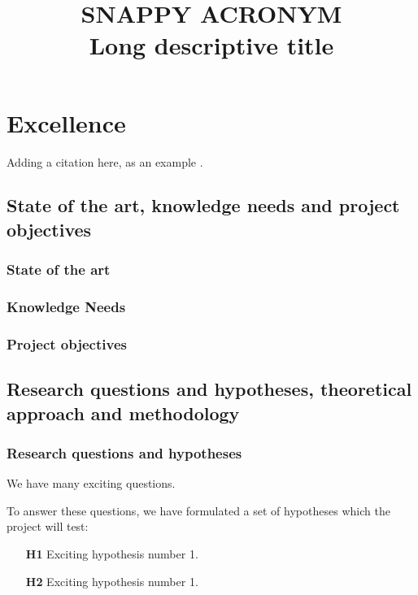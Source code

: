 \documentclass[a4paper,11pt,english]{article}
\title{ \vspace{-1.5cm}SNAPPY ACRONYM\\ Long descriptive title}
\begin{document}
\tableofcontents
\pagebreak


\maketitle
\vspace{-2.cm}

\section{Excellence}

Adding a citation here, as an example \citep{einstein1906theorie}.


\subsection{State of the art, knowledge needs and project objectives}

\subsubsection{State of the art}

\subsubsection{Knowledge Needs}

\subsubsection{Project objectives}

\subsection{Research questions and hypotheses, theoretical approach and methodology}

\subsubsection{Research questions and hypotheses}

We have many exciting questions.

To answer these questions, we have formulated a set of hypotheses which the
project will test:
\begin{itemize}
    \item[\bf H1] Exciting hypothesis number 1.
    \item[\bf H2] Exciting hypothesis number 1.
\end{itemize}
\end{document}
